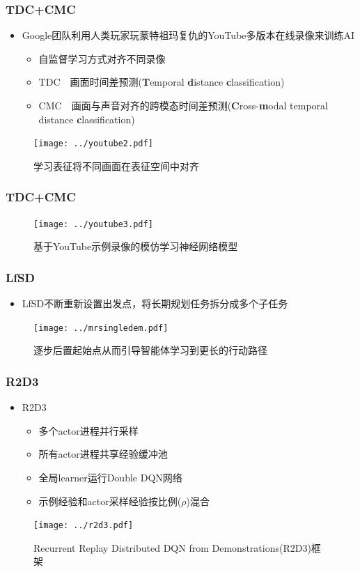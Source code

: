 \documentclass{beamer}
\begin{document}
\begin{CJK*}{GBK}{hei}
\begin{frame}\frametitle{TDC+CMC}
\begin{itemize}
\item Google团队利用人类玩家玩蒙特祖玛复仇的YouTube多版本在线录像来训练AI\citep{Aytar2018PlayingHE}
{
\begin{itemize}
\item 自监督学习方式对齐不同录像
\item TDC~~画面时间差预测(\textbf{T}emporal \textbf{d}istance \textbf{c}lassification)
\item CMC~~画面与声音对齐的跨模态时间差预测(\textbf{C}ross-\textbf{m}odal temporal distance \textbf{c}lassification)
\end{itemize}
}
\end{itemize}
\begin{figure}[htbp]
    \centering\texttt{[image: ../youtube2.pdf]}
	    \caption{学习表征将不同画面在表征空间中对齐}
\end{figure}
\end{frame}

\begin{frame}\frametitle{TDC+CMC}
        \begin{figure}[htbp]
            \centering\texttt{[image: ../youtube3.pdf]}
	    \caption{基于YouTube示例录像的模仿学习神经网络模型}
        \end{figure}
\end{frame}

\begin{frame}\frametitle{LfSD}
\begin{itemize}
\item LfSD\citep{Salimans2018LearningMR}不断重新设置出发点，将长期规划任务拆分成多个子任务
\end{itemize}
\begin{figure}[htbp]
    \centering\texttt{[image: ../mrsingledem.pdf]}
\caption{逐步后置起始点从而引导智能体学习到更长的行动路径}
\end{figure}
\end{frame}

\begin{frame}\frametitle{R2D3}
\begin{itemize}
\item R2D3\citep{Paine2020MakingEU}
{
\begin{itemize}
\item 多个actor进程并行采样
\item 所有actor进程共享经验缓冲池
\item 全局learner运行Double DQN网络
\item 示例经验和actor采样经验按比例($\rho$)混合
\end{itemize}
}
\end{itemize}
        \begin{figure}[htbp]
            \centering\texttt{[image: ../r2d3.pdf]}
	    \caption{Recurrent Replay Distributed DQN from Demonstrations(R2D3)框架}
        \end{figure}
\end{frame}


\end{CJK*}
\end{document}
